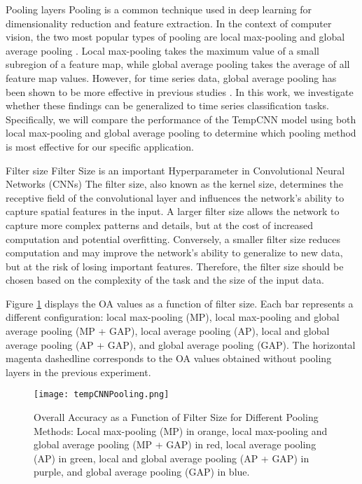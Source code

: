 \begin{paragraph}{Pooling layers}
Pooling is a common technique used in deep learning for dimensionality reduction and feature extraction.
In the context of computer vision, the two most popular types of pooling are local max-pooling \cite{Ren2015Faster} and global average pooling \cite{He2016Deep}.
Local max-pooling takes the maximum value of a small subregion of a feature map, while global average pooling takes the average of all feature map values.
However, for time series data, global average pooling has been shown to be more effective in previous studies \cite{rs10020236,fawaz2018deep}.
In this work, we investigate whether these findings can be generalized to time series classification tasks. 
Specifically, we will compare the performance of the TempCNN model using both local max-pooling and global average pooling to determine which pooling method is most effective for our specific application.
\end{paragraph}

\begin{paragraph}{Filter size}
Filter Size is an important Hyperparameter in Convolutional Neural Networks (CNNs)
The filter size, also known as the kernel size, determines the receptive field of the convolutional layer and influences the network's ability to capture spatial features in the input.
A larger filter size allows the network to capture more complex patterns and details, but at the cost of increased computation and potential overfitting.
Conversely, a smaller filter size reduces computation and may improve the network's ability to generalize to new data, but at the risk of losing important features.
Therefore, the filter size should be chosen based on the complexity of the task and the size of the input data.
\end{paragraph}


Figure \ref{tab:tempCNNPooling} displays the OA values as a function of filter size. 
Each bar represents a different configuration: local max-pooling (MP), local max-pooling and global average pooling (MP + GAP), local average pooling (AP), local and global average pooling (AP + GAP), and global average pooling (GAP). 
The horizontal magenta dashedline corresponds to the OA values obtained without pooling layers in the previous experiment.


\begin{figure}[!htbp]
  \centering
  \texttt{[image: tempCNNPooling.png]}
  \caption{Overall Accuracy as a Function of Filter Size for Different Pooling Methods: Local max-pooling (MP) in orange, local max-pooling and global average pooling (MP + GAP) in red, local average pooling (AP) in green, local and global average pooling (AP + GAP) in purple, and global average pooling (GAP) in blue.}
  \label{tab:tempCNNPooling}
\end{figure}


